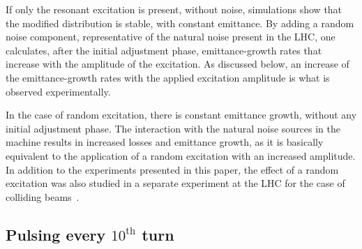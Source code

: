 \documentclass[%
 reprint,
 amsmath,amssymb,
 aps,
prstab,
longbibliography
]{revtex4-1}
\begin{document}
If only the resonant excitation is present, without noise, simulations
show that the modified distribution is stable, with constant
emittance. By adding a random noise component, representative of the
natural noise present in the LHC, one calculates, after the initial
adjustment phase, emittance-growth rates that increase with the
amplitude of the excitation. As discussed below, an increase of the
emittance-growth rates with the applied excitation amplitude is what
is observed experimentally.

In the case of random excitation, there is constant emittance growth,
without any initial adjustment phase. The interaction with the natural
noise sources in the machine results in increased losses and emittance
growth, as it is basically equivalent to the application of a random
excitation with an increased amplitude. In addition to the experiments
presented in this paper, the effect of a random excitation was also
studied in a separate experiment at the LHC for the case of colliding
beams~\cite{md1433_noise_top_energy, md_noise_bbLHC}.


\subsection{Pulsing every $10^{\mathrm{th}}$ turn}
\label{sec:simex10}
\end{document}
